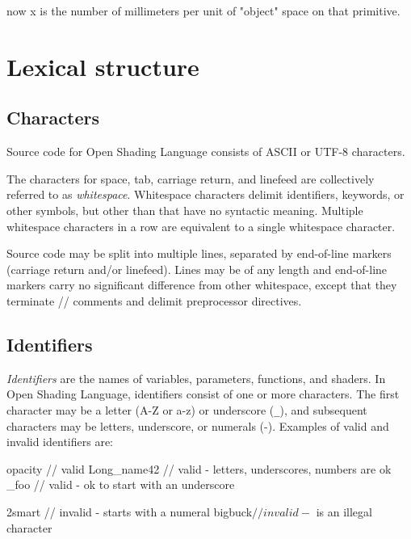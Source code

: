 \documentclass[11pt,letterpaper]{book}
\def\langname{Open Shading Language\xspace}
\def\objectspace{{\cf "object"} space\xspace}
\begin{document}
now {\cf x} is the number of millimeters per unit of \objectspace on
that primitive.


\chapter{Lexical structure}
\label{chap:lexical}

\section{Characters}
\label{sec:lexical:chars}

Source code for \langname consists of ASCII or UTF-8 characters.

The characters for space, tab, carriage return, and linefeed are
collectively referred to as \emph{whitespace}.  Whitespace characters
delimit identifiers, keywords, or other symbols, but other than that
have no syntactic meaning.  Multiple whitespace characters in a row
are equivalent to a single whitespace character. 

Source code may be split into multiple lines, separated by end-of-line
markers (carriage return and/or linefeed).  Lines may be of any length
and end-of-line markers carry no significant difference from other 
whitespace, except that they terminate {\cf //} comments and delimit
preprocessor directives.

\section{Identifiers}
\label{sec:identifiers}

\emph{Identifiers} are the names of variables, parameters, functions,
and shaders.  In \langname, identifiers consist of one or more
characters.  The first character may be a letter ({\cf A}-{\cf Z} or
{\cf a}-{\cf z}) or underscore (\verb|_|), and subsequent characters may
be letters, underscore, or numerals ({}-{}).  Examples of
valid and invalid identifiers are:

\begin{code}
    opacity       // valid
    Long_name42   // valid - letters, underscores, numbers are ok
    _foo          // valid - ok to start with an underscore

    2smart        // invalid - starts with a numeral
    bigbuck$      // invalid - $ is an illegal character
\end{code}
\end{document}
